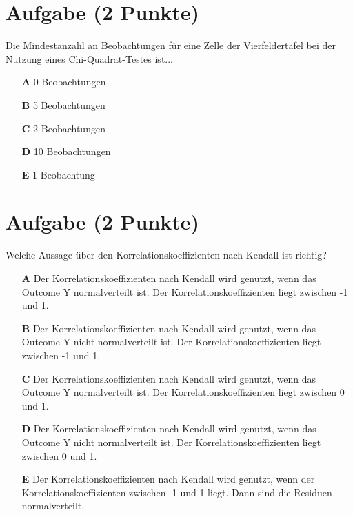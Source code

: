\documentclass[a4paper, 10pt]{scrartcl}\usepackage[]{graphicx}\usepackage[]{xcolor}
\begin{document}
\section{Aufgabe \hfill (2 Punkte)}

Die Mindestanzahl an Beobachtungen f{\"u}r eine Zelle der Vierfeldertafel bei
der Nutzung eines Chi-Quadrat-Testes ist...



\begin{enumerate}
\item [\textbf{A} \msquare] 0 Beobachtungen
\item [\textbf{B} \msquare] 5 Beobachtungen
\item [\textbf{C} \msquare] 2 Beobachtungen
\item [\textbf{D} \msquare] 10 Beobachtungen
\item [\textbf{E} \msquare] 1 Beobachtung
\end{enumerate} 

\section{Aufgabe \hfill (2 Punkte)}




Welche Aussage {\"u}ber den Korrelationskoeffizienten nach Kendall
ist richtig?



\begin{enumerate}
\item [\textbf{A} \msquare] Der Korrelationskoeffizienten nach Kendall wird genutzt, wenn das Outcome Y normalverteilt ist. Der Korrelationskoeffizienten liegt zwischen -1 und 1.
\item [\textbf{B} \msquare] Der Korrelationskoeffizienten nach Kendall wird genutzt, wenn das Outcome Y nicht normalverteilt ist. Der Korrelationskoeffizienten liegt zwischen -1 und 1.
\item [\textbf{C} \msquare] Der Korrelationskoeffizienten nach Kendall wird genutzt, wenn das Outcome Y normalverteilt ist. Der Korrelationskoeffizienten liegt zwischen 0 und 1.
\item [\textbf{D} \msquare] Der Korrelationskoeffizienten nach Kendall wird genutzt, wenn das Outcome Y nicht normalverteilt ist. Der Korrelationskoeffizienten liegt zwischen 0 und 1.
\item [\textbf{E} \msquare] Der Korrelationskoeffizienten nach Kendall wird genutzt, wenn der Korrelationskoeffizienten zwischen -1 und 1 liegt. Dann sind die Residuen normalverteilt.
\end{enumerate} 
\end{document}
